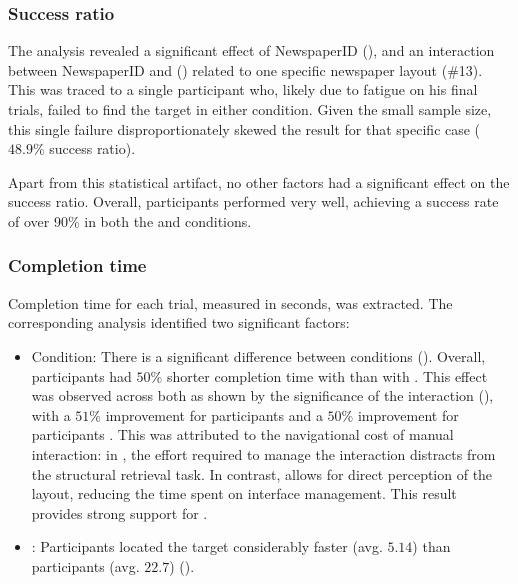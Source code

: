 \subsubsection{Success ratio}

The analysis revealed a significant effect of NewspaperID (), and an interaction between NewspaperID and \CVAS  () related to one specific newspaper layout (\#13). This was traced to a single participant \LV who, likely due to fatigue on his final trials, failed to find the target in either condition. Given the small sample size, this single failure disproportionately skewed the result for that specific case ($48.9\%$ success ratio).

Apart from this statistical artifact, no other factors had a significant effect on the success ratio. Overall, participants performed very well, achieving a success rate of over 90\% in both the \condonenot and \condtwonot conditions.

\subsubsection{Completion time}

Completion time for each trial, measured in seconds, was extracted. The corresponding analysis identified two significant factors:
\begin{itemize}
    \item {Condition:} There is a significant difference between conditions (). Overall, participants had $50\%$ shorter completion time with \condtwonot than with \condonenot {}. This effect was observed across both \CVAS  as shown by the significance of the interaction (), with a $51\%$ improvement for participants \NV  {} and a $50\%$ improvement for participants \LV {}. This was attributed to the navigational cost of manual interaction: in \condonenot, the effort required to manage the interaction distracts from the structural retrieval task. In contrast, \condtwonot allows for direct perception of the layout, reducing the time spent on interface management. This result provides strong support for \hypfindingperformance.

     \item {\CVAS: }Participants \NV located the target considerably faster (avg. $5.14$\seconds) than participants \LV (avg. $22.7$\seconds) ().
\end{itemize}

